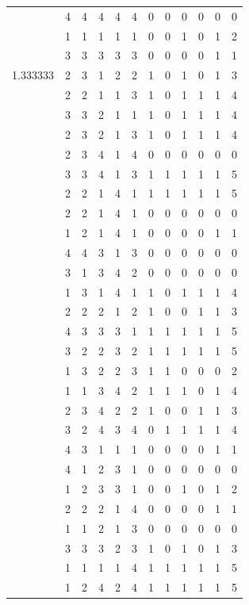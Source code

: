 \documentclass[]{book}
\theoremstyle{definition}
\theoremstyle{definition}
\theoremstyle{definition}
\theoremstyle{remark}
\begin{document}
\begin{table}
{\begin{tabular}[t]{rrrrrrrrrrrr}
 & 4 & 4 & 4 & 4 & 4 & 0 & 0 & 0 & 0 & 0 & 0\\
 & 1 & 1 & 1 & 1 & 1 & 0 & 0 & 1 & 0 & 1 & 2\\
 & 3 & 3 & 3 & 3 & 3 & 0 & 0 & 0 & 0 & 1 & 1\\
1.333333 & 2 & 3 & 1 & 2 & 2 & 1 & 0 & 1 & 0 & 1 & 3\\
 & 2 & 2 & 1 & 1 & 3 & 1 & 0 & 1 & 1 & 1 & 4\\
 & 3 & 3 & 2 & 1 & 1 & 1 & 0 & 1 & 1 & 1 & 4\\
 & 2 & 3 & 2 & 1 & 3 & 1 & 0 & 1 & 1 & 1 & 4\\
 & 2 & 3 & 4 & 1 & 4 & 0 & 0 & 0 & 0 & 0 & 0\\
 & 3 & 3 & 4 & 1 & 3 & 1 & 1 & 1 & 1 & 1 & 5\\
 & 2 & 2 & 1 & 4 & 1 & 1 & 1 & 1 & 1 & 1 & 5\\
 & 2 & 2 & 1 & 4 & 1 & 0 & 0 & 0 & 0 & 0 & 0\\
 & 1 & 2 & 1 & 4 & 1 & 0 & 0 & 0 & 0 & 1 & 1\\
 & 4 & 4 & 3 & 1 & 3 & 0 & 0 & 0 & 0 & 0 & 0\\
 & 3 & 1 & 3 & 4 & 2 & 0 & 0 & 0 & 0 & 0 & 0\\
 & 1 & 3 & 1 & 4 & 1 & 1 & 0 & 1 & 1 & 1 & 4\\
 & 2 & 2 & 2 & 1 & 2 & 1 & 0 & 0 & 1 & 1 & 3\\
 & 4 & 3 & 3 & 3 & 1 & 1 & 1 & 1 & 1 & 1 & 5\\
 & 3 & 2 & 2 & 3 & 2 & 1 & 1 & 1 & 1 & 1 & 5\\
 & 1 & 3 & 2 & 2 & 3 & 1 & 1 & 0 & 0 & 0 & 2\\
 & 1 & 1 & 3 & 4 & 2 & 1 & 1 & 1 & 0 & 1 & 4\\
 & 2 & 3 & 4 & 2 & 2 & 1 & 0 & 0 & 1 & 1 & 3\\
 & 3 & 2 & 4 & 3 & 4 & 0 & 1 & 1 & 1 & 1 & 4\\
 & 4 & 3 & 1 & 1 & 1 & 0 & 0 & 0 & 0 & 1 & 1\\
 & 4 & 1 & 2 & 3 & 1 & 0 & 0 & 0 & 0 & 0 & 0\\
 & 1 & 2 & 3 & 3 & 1 & 0 & 0 & 1 & 0 & 1 & 2\\
 & 2 & 2 & 2 & 1 & 4 & 0 & 0 & 0 & 0 & 1 & 1\\
 & 1 & 1 & 2 & 1 & 3 & 0 & 0 & 0 & 0 & 0 & 0\\
 & 3 & 3 & 3 & 2 & 3 & 1 & 0 & 1 & 0 & 1 & 3\\
 & 1 & 1 & 1 & 1 & 4 & 1 & 1 & 1 & 1 & 1 & 5\\
 & 1 & 2 & 4 & 2 & 4 & 1 & 1 & 1 & 1 & 1 & 5\\

\end{tabular}}
\end{table}
\end{document}
